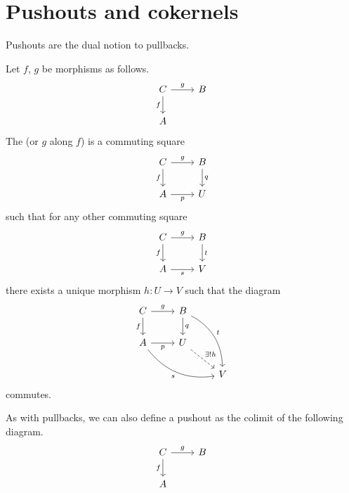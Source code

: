 \documentclass[notes.tex]{subfiles}
\begin{document}
\section{Pushouts and cokernels}

Pushouts are the dual notion to pullbacks.
\begin{definition}[pushouts]
  \label{def:pushout}
  Let $f$, $g$ be morphisms as follows.
  \begin{equation*}
    \begin{tikzcd}
      C \arrow[r, "g"] \arrow[d, swap, "f"] & B \\
      A
    \end{tikzcd}
  \end{equation*}
  The  (or $g$ along $f$) is a commuting square
  \begin{equation*}
    \begin{tikzcd}
      C \arrow[r, "g"] \arrow[d, swap, "f"] & B \arrow[d, "q"] \\
      A \arrow[r, swap, "p"] & U
    \end{tikzcd}
  \end{equation*}
  such that for any other commuting square
  \begin{equation*}
    \begin{tikzcd}
      C \arrow[r, "g"] \arrow[d, swap, "f"] & B \arrow[d, "t"] \\
      A \arrow[r, swap, "s"] & V
    \end{tikzcd}
  \end{equation*}
  there exists a unique morphism $h\colon U \to V$ such that the diagram
  \begin{equation*}
    \begin{tikzcd}
      C \arrow[r, "g"] \arrow[d, swap, "f"] & B \arrow[d, "q"] \arrow[ddr, bend left, "t"] & \\
      A \arrow[drr, bend right, swap, "s"] \arrow[r, swap, "p"] & U \arrow[dr, dashed, "\exists!h"] & \\
      & & V
    \end{tikzcd}
  \end{equation*}
  commutes.
\end{definition}

\begin{note}
  As with pullbacks, we can also define a pushout as the colimit of the following diagram.
  \begin{equation*}
    \begin{tikzcd}
      C \arrow[r, "g"] \arrow[d, swap, "f"] & B \\
      A
    \end{tikzcd}
  \end{equation*}
\end{note}
\end{document}
